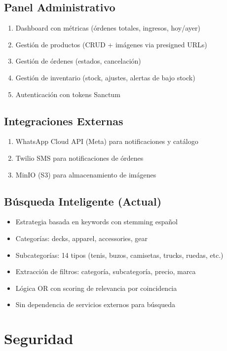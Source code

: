 \documentclass[11pt,a4paper]{article}
\begin{document}
\subsection{Panel Administrativo}
\begin{enumerate}
    \item Dashboard con métricas (órdenes totales, ingresos, hoy/ayer)
    \item Gestión de productos (CRUD + imágenes via presigned URLs)
    \item Gestión de órdenes (estados, cancelación)
    \item Gestión de inventario (stock, ajustes, alertas de bajo stock)
    \item Autenticación con tokens Sanctum
\end{enumerate}

\subsection{Integraciones Externas}
\begin{enumerate}
    \item WhatsApp Cloud API (Meta) para notificaciones y catálogo
    \item Twilio SMS para notificaciones de órdenes
    \item MinIO (S3) para almacenamiento de imágenes
\end{enumerate}

\subsection{Búsqueda Inteligente (Actual)}
\begin{itemize}
    \item Estrategia basada en keywords con stemming español
    \item Categorías: decks, apparel, accessories, gear
    \item Subcategorías: 14 tipos (tenis, buzos, camisetas, trucks, ruedas, etc.)
    \item Extracción de filtros: categoría, subcategoría, precio, marca
    \item Lógica OR con scoring de relevancia por coincidencia
    \item Sin dependencia de servicios externos para búsqueda
\end{itemize}

\section{Seguridad}
\end{document}
